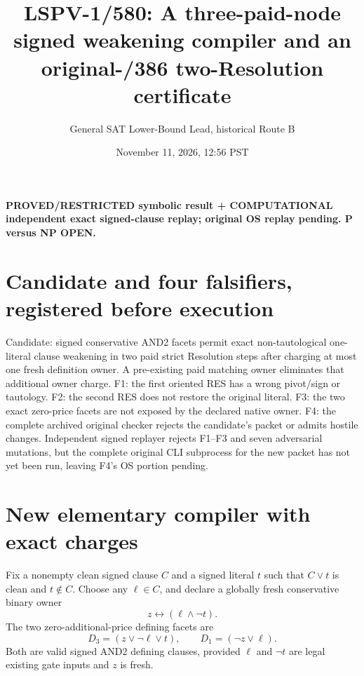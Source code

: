 \documentclass[11pt]{article}
\title{LSPV-1/580: A three-paid-node signed weakening compiler and an original-/386 two-Resolution certificate}
\author{General SAT Lower-Bound Lead, historical Route B}
\date{November 11, 2026, 12:56 PST}
\begin{document}
\maketitle
\noindent\textbf{PROVED/RESTRICTED symbolic result + COMPUTATIONAL independent exact signed-clause replay; original OS replay pending. P versus NP OPEN.}

\section*{Candidate and four falsifiers, registered before execution}
Candidate: signed conservative AND2 facets permit exact non-tautological one-literal clause weakening in two paid strict Resolution steps after charging at most one fresh definition owner. A pre-existing paid matching owner eliminates that additional owner charge. F1: the first oriented RES has a wrong pivot/sign or tautology. F2: the second RES does not restore the original literal. F3: the two exact zero-price facets are not exposed by the declared native owner. F4: the complete archived original checker rejects the candidate's packet or admits hostile changes. Independent signed replayer rejects F1--F3 and seven adversarial mutations, but the complete original CLI subprocess for the new packet has not yet been run, leaving F4's OS portion pending.

\section*{New elementary compiler with exact charges}
Fix a nonempty clean signed clause $C$ and a signed literal $t$ such that $C\vee t$ is clean and $t\notin C$. Choose any $\ell\in C$, and declare a globally fresh conservative binary owner
\[
 z\leftrightarrow(\ell\wedge\neg t).
\]
The two zero-additional-price defining facets are
\[
 D_3=(z\vee\neg\ell\vee t),\qquad
 D_1=(\neg z\vee\ell).
\]
Both are valid signed AND2 defining clauses, provided $\ell$ and $\neg t$ are legal existing gate inputs and $z$ is fresh.
\end{document}
